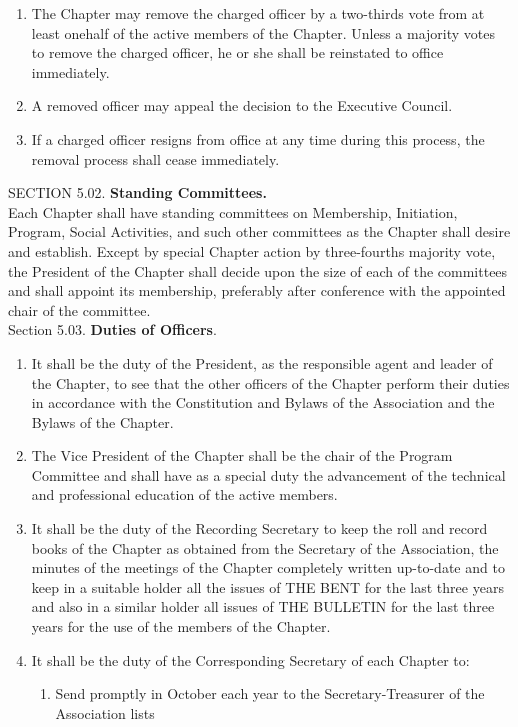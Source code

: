 \begin{optionalpart}
\begin{enumerate}
\begin{enumerate}
\item The Chapter may remove the charged officer by a two-thirds vote from at least onehalf of the active members of the Chapter. Unless a majority votes to remove the charged 
officer, he or she shall be reinstated to office immediately.
\item A removed officer may appeal the decision to the Executive Council. 
\item If a charged officer resigns from office at any time during this process, the removal 
process shall cease immediately.
\end{enumerate}
\end{enumerate}
SECTION 5.02. {\bf Standing Committees.}\\ Each Chapter shall have standing committees on 
Membership, Initiation, Program, Social Activities, and such other committees as the Chapter 
shall desire and establish. Except by special Chapter action by three-fourths majority vote, the 
President of the Chapter shall decide upon the size of each of the committees and shall appoint 
its membership, preferably after conference with the appointed chair of the committee.\\[1em]
Section 5.03. {\bf Duties of Officers}.
\begin{enumerate}
\item It shall be the duty of the President, as the responsible 
agent and leader of the Chapter, to see that the other officers of the Chapter perform their duties in 
accordance with the Constitution and Bylaws of the Association and the Bylaws of the Chapter.
\item The Vice President of the Chapter shall be the chair of the Program Committee and shall have as 
a special duty the advancement of the technical and professional education of the active members.
\item It shall be the duty of the Recording Secretary to keep the roll and record books of the 
Chapter as obtained from the Secretary of the Association, the minutes of the meetings of 
the Chapter completely written up-to-date and to keep in a suitable holder all the issues of 
THE BENT for the last three years and also in a similar holder all issues of THE BULLETIN
for the last three years for the use of the members of the Chapter.
\item It shall be the duty of the Corresponding Secretary of each Chapter to:
\begin{enumerate}
\item Send promptly in October each year to the Secretary-Treasurer of the Association lists 

\end{enumerate}
\end{enumerate}
\end{optionalpart}
